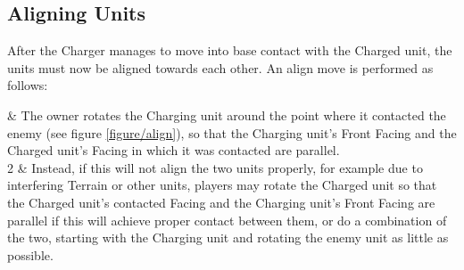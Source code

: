 \columnbreak

\subsection{Aligning Units}
\label{aligning_units}

After the Charger manages to move into base contact with the Charged unit, the units must now be aligned towards each other. An align move is performed as follows:

 & The owner rotates the Charging unit around the point where it contacted the enemy (see figure \ref{figure/align}), so that the Charging unit's Front Facing and the Charged unit's Facing in which it was contacted are parallel.\\
	2 & Instead, if this will not align the two units properly, for example due to interfering Terrain or other units, players may rotate the Charged unit so that the Charged unit’s contacted Facing and the Charging unit’s Front Facing are parallel if this will achieve proper contact between them, or do a combination of the two, starting with the Charging unit and rotating the enemy unit as little as possible.\\
\closeseqtablemc

\newcommand{\maxcontactA}{a)}
\newcommand{\maxcontactBOne}{b1)}
\newcommand{\maxcontactBTwo}{b2)}
\newcommand{\maxcontactCharge}{\smallfontsize{\flufffont{Charge!}}}

